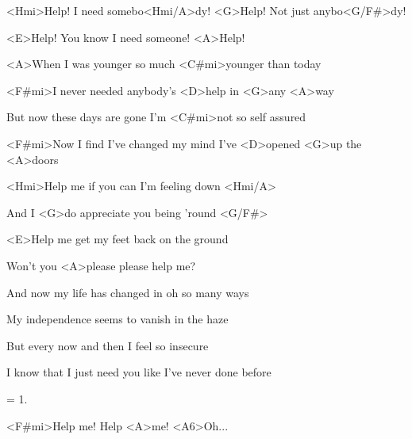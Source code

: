 

<Hmi>Help! I need somebo<Hmi/A>dy! <G>Help! Not just anybo<G/F#>dy!

<E>Help! You know I need someone! <A>Help!

\zs
<A>When I was younger so much <C#mi>younger than today

<F#mi>I never needed anybody's <D>help in <G>any <A>way

But now these days are gone I'm <C#mi>not so self assured

<F#mi>Now I find I've changed my mind I've <D>opened <G>up the <A>doors
\ks

\zr
<Hmi>Help me if you can I'm feeling down <Hmi/A>

And I <G>do appreciate you being 'round <G/F#>

<E>Help me get my feet back on the ground

Won't you <A>please please help me?
\kr

\zs
And now my life has changed in oh so many ways

My independence seems to vanish in the haze

But every now and then I feel so insecure

I know that I just need you like I've never done before
\ks

\zr \kr

\zs
= 1.
\ks

\zr
<F#mi>Help me! Help <A>me! <A6>Oh...
\kr

\kp





